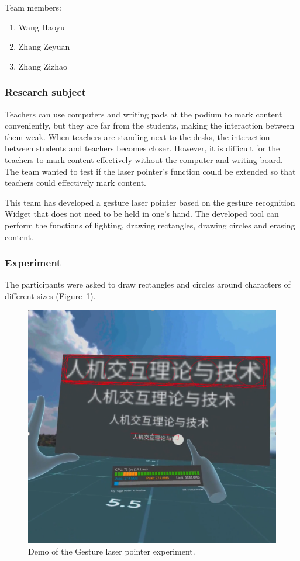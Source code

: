 Team members:
\begin{enumerate}
    \item Wang Haoyu
    \item Zhang Zeyuan 
    \item Zhang Zizhao
\end{enumerate}


\subsubsection{Research subject}
Teachers can use computers and writing pads at the podium to mark content conveniently, but they are far from the students, making the interaction between them weak.
When teachers are standing next to the desks, the interaction between students and teachers becomes closer. However, it is difficult for the teachers to mark content effectively without the computer and writing board.
The team wanted to test if the laser pointer's function could be extended so that teachers could effectively mark content.

This team has developed a gesture laser pointer based on the gesture recognition Widget that does not need to be held in one's hand.
The developed tool can perform the functions of lighting, drawing rectangles, drawing circles and erasing content.

\subsubsection{Experiment}

The participants were asked to draw rectangles and circles around characters of different sizes (Figure~\ref{fig:Project9-figure}). 

\begin{figure}
  \centering
  \includegraphics[width=0.6\linewidth]{figures/Project_9.png}
  \caption{Demo of the Gesture laser pointer experiment.}
  \label{fig:Project9-figure}
\end{figure}


